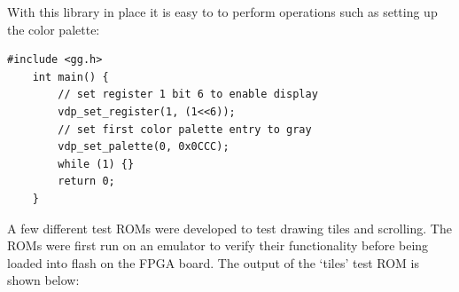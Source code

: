 \documentclass{article}
\begin{document}
With this library in place it is easy to to perform operations such as setting
up the color palette:

\begin{lstlisting}[caption=Color Palette Test ROM]
    #include <gg.h>
    int main() {
        // set register 1 bit 6 to enable display
        vdp_set_register(1, (1<<6));
        // set first color palette entry to gray
        vdp_set_palette(0, 0x0CCC);
        while (1) {}
        return 0;
    }
\end{lstlisting}

A few different test ROMs were developed to test drawing tiles and scrolling.
The ROMs were first run on an emulator to verify their functionality before
being loaded into flash on the FPGA board. The output of the `tiles' test ROM
is shown below:
\end{document}
